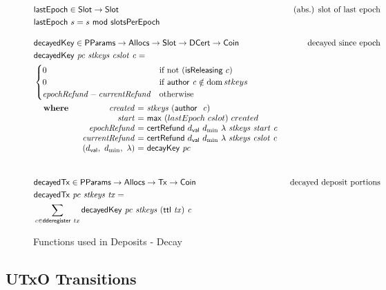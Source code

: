 \documentclass[11pt,a4paper,dvipsnames]{article}
\newcommand{\Tx}{\type{Tx}}
\newcommand{\Coin}{\type{Coin}}
\newcommand{\PParams}{\type{PParams}}
\newcommand{\Slot}{\type{Slot}}
\newcommand{\Allocs}{\type{Allocs}}
\newcommand{\DCert}{\type{DCert}}
\newcommand{\ttl}[1]{\fun{ttl}~ \var{#1}}
\newcommand{\decayedKey}[4]{\fun{decayedKey}~ \var{#1}~ \var{#2}~ \var{#3}~ \var{#4}}
\newcommand{\decayedTx}[3]{\fun{decayedTx}~ \var{#1}~ \var{#2}~ \var{#3}}
\newcommand{\certRefund}[6]{\fun{certRefund}~ {#1}~{#2}~{#3}~\var{#4}~\var{#5}~\var{#6}}
\newcommand{\cauthor}[1]{\fun{author}~ \var{#1}}
\newcommand{\dval}{\ensuremath{d_{\mathsf{val}}}}
\newcommand{\slotsPer}{\ensuremath{\mathsf{slotsPerEpoch}}}
\theoremstyle{definition}
\theoremstyle{definition}
\begin{document}
\begin{figure}
  \begin{align*}
      & \fun{lastEpoch} \in \Slot \to \Slot
      & \text{(abs.) slot of last epoch} \\
      & \fun{lastEpoch}~{s} =  s~\mathsf{mod}~\slotsPer
      \nextdef
      & \fun{decayedKey} \in
      \PParams \to \Allocs \to \Slot \to \DCert \to \Coin
      & \text{decayed since epoch} \\
      & \decayedKey{pc}{stkeys}{cslot}{c} =\\
      & \begin{cases}
        0 & \text{if not}~(\fun{isReleasing}~c)\\
            0 & \text{if}~\cauthor c \notin \dom stkeys\\
            \var{epochRefund} - \var{currentRefund}
            & \text{otherwise}
        \end{cases}\\
      &
      \begin{array}{lr@{~=~}l}
        \where
          & \var{created} & \var{stkeys}~(\cauthor~\var{c}) \\
          & \var{start} & \mathsf{max}~(lastEpoch~cslot)~created \\
          & \var{epochRefund} & \certRefund{\dval}{d_{\min}}{\lambda}{stkeys}{start}{c} \\
          & \var{currentRefund} & \certRefund{\dval}{d_{\min}}{\lambda}{stkeys}{cslot}{c} \\
          & (\dval,~d_{\min},~\lambda) & \fun{decayKey}~\var{pc}\\
      \end{array}\\
      \nextdef
      & \fun{decayedTx} \in \PParams \to \Allocs \to \Tx \to \Coin
      & \text{decayed deposit portions} \\
      & \decayedTx{pc}{stkeys}{tx} =\\
      &   \sum\limits_{c \in \fun{dderegister}~tx} \decayedKey{pc}{stkeys}{(\ttl{tx})}{c}\\
  \end{align*}
  \caption{Functions used in Deposits - Decay}
  \label{fig:functions:deposits-decay}
\end{figure}

\clearpage

\subsection{UTxO Transitions}
\label{sec:state-trans-utxo-1}
\end{document}
